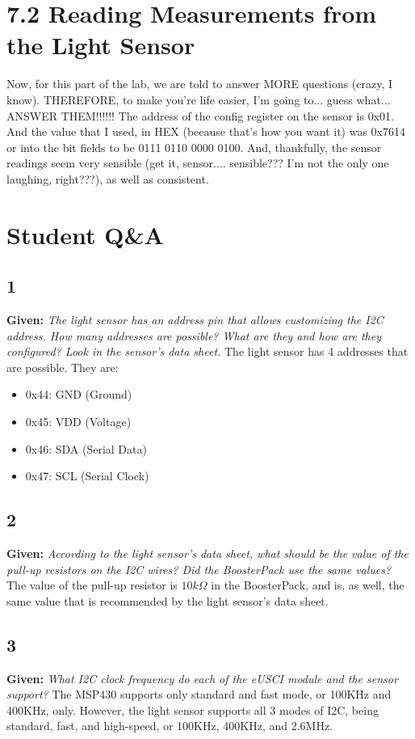 \documentclass{article}
\begin{document}
\section{7.2 Reading Measurements from the Light Sensor}
Now, for this part of the lab, we are told to answer MORE questions (crazy, I know). THEREFORE, to make you're life easier, I'm going to... guess what... ANSWER THEM!!!!!! The address of the config register on the sensor is 0x01. And the value that I used, in HEX (because that's how you want it) was 0x7614 or into the bit fields to be 0111 0110 0000 0100. And, thankfully, the sensor readings seem very sensible (get it, sensor.... sensible??? I'm not the only one laughing, right???), as well as consistent.

\pagebreak

\section{Student Q\&A}
\subsection{1}
\textbf{Given:} \textit{The light sensor has an address pin that allows customizing the I2C address. How many addresses are possible? What are they and how are they configured? Look in the sensor’s data sheet.}
\newline
The light sensor has 4 addresses that are possible. They are:
\begin{itemize}
  \item 0x44: GND (Ground)
  \item 0x45: VDD (Voltage)
  \item 0x46: SDA (Serial Data)
  \item 0x47: SCL (Serial Clock)
\end{itemize}

\subsection{2}
\textbf{Given:} \textit{According to the light sensor’s data sheet, what should be the value of the pull-up resistors on the I2C wires? Did the BoosterPack use the same values?}
\newline
The value of the pull-up resistor is $10k\Omega$ in the BoosterPack, and is, as well, the same value that is recommended by the light sensor's data sheet.

\subsection{3}
\textbf{Given:} \textit{What I2C clock frequency do each of the eUSCI module and the sensor support?}
\newline
The MSP430 supports only standard and fast mode, or 100KHz and 400KHz, only. However, the light sensor supports all 3 modes of I2C, being standard, fast, and high-speed, or 100KHz, 400KHz, and 2.6MHz.
\end{document}
